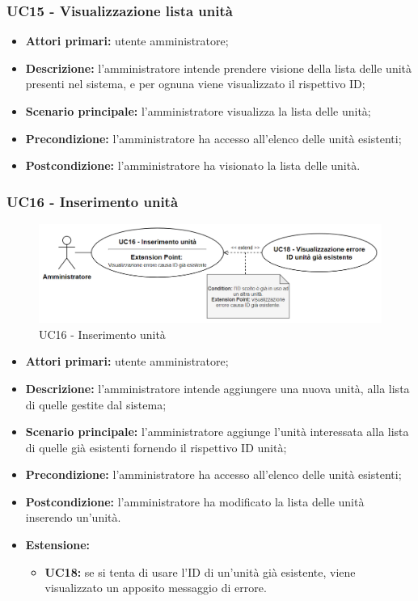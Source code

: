 \subsubsection{UC15 - Visualizzazione lista unità}
\begin{itemize}
	\item \textbf{Attori primari:} utente amministratore;
	\item \textbf{Descrizione:} l'amministratore intende prendere visione della lista delle unità presenti nel sistema, e per ognuna viene visualizzato il rispettivo ID;
	\item \textbf{Scenario principale:} l'amministratore visualizza la lista delle unità;
	\item \textbf{Precondizione:} l'amministratore ha accesso all'elenco delle unità esistenti;
	\item \textbf{Postcondizione:} l'amministratore ha visionato la lista delle unità.
\end{itemize}

\subsubsection{UC16 - Inserimento unità}
	\begin{figure}[H]
		\centering
		\includegraphics[width=15cm]{images/UC16.png}
		\caption{UC16 - Inserimento unità}
	\end{figure}
	\begin{itemize}
		\item \textbf{Attori primari:} utente amministratore;
		\item \textbf{Descrizione:} l'amministratore intende aggiungere una nuova unità, alla lista di quelle gestite dal sistema;
		\item \textbf{Scenario principale:} l'amministratore aggiunge l'unità interessata alla lista di quelle già esistenti fornendo il rispettivo ID unità;
		\item \textbf{Precondizione:} l'amministratore ha accesso all'elenco delle unità esistenti;
		\item \textbf{Postcondizione:} l'amministratore ha modificato la lista delle unità inserendo un'unità.
		\item \textbf{Estensione:}
		\begin{itemize}
			\item \textbf{UC18:} se si tenta di usare l'ID di un'unità già esistente, viene visualizzato un apposito messaggio di errore.
		\end{itemize}
	\end{itemize}

